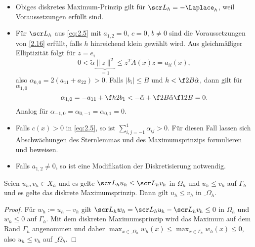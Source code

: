 \begin{note}
	\begin{itemize}
		\item
			Obiges diskretes Maximum-Prinzip gilt für $\scr L_h = - \Laplace_h$, weil Voraussetzungen erfüllt sind.
		\item
			Für $\scr L_h$ aus \eqref{eq:2.5} mit $a_{1,2} = 0$, $c = 0$, $b \neq 0$ sind die Voraussetzungen von \ref{2.16} erfüllt, falls $h$ hinreichend klein gewählt wird.
			Aus gleichmäßiger Elliptizität folgt für $z = e_i$
			\[
				0 < \tilde \alpha \underbrace{\|z\|^2}_{= 1} \le z^T A(x) z = a_{ii}(x),
			\]
			also $\alpha_{0,0} = 2(a_{11} + a_{22}) > 0$.
			Falls $|b_i| \le B$ und $h < \f 2B \tilde \alpha$, dann gilt für $\alpha_{1,0}$
			\[
				\alpha_{1,0}
				= -a_{11} + \f h2 b_1
				< -\tilde \alpha + \f 2B \tilde \alpha \f 12 B
				= 0.
			\]
			Analog für $\alpha_{-1,0} = \alpha_{0,-1} = \alpha_{0,1} = 0$.
		\item
			Falls $c(x) > 0$ in \eqref{eq:2.5}, so ist $\sum_{i,j = -1}^1 \alpha_{ij} > 0$.
			Für diesen Fall lassen sich Abschwächungen des Sternlemmas und des Maximumsprinzips formulieren und beweisen.
		\item
			Falls $a_{1,2} \neq 0$, so ist eine Modifikation der Diskretisierung notwendig.
	\end{itemize}
\end{note}

\begin{kor} \label{2.18}
	Seien $u_h, v_h \in X_h$ und es gelte $\scr L_h u_h \le \scr L_h v_h$ in $\Omega_h$ und $u_h \le v_h$ auf $\Gamma_h$ und es gelte das diskrete Maximumsprinzip.
	Dann gilt $u_h \le v_h$ in $\_\Omega_h$.
	\begin{proof}
		Für $w_h := u_h - v_h$ gilt $\scr L_h w_h = \scr L_h u_h - \scr L_h v_h \le 0$ in $\Omega_h$ und $w_h \le 0$ auf $\Gamma_h$.
		Mit dem diskreten Maximumsprinzip wird das Maximum auf dem Rand $\Gamma_h$ angenommen und daher $\max_{x\in \_\Omega_h} w_h(x) \le \max_{x\in\Gamma_h}w_h(x) \le 0$, also $u_h \le v_h$ auf $\_\Omega_h$.
	\end{proof}
\end{kor}

